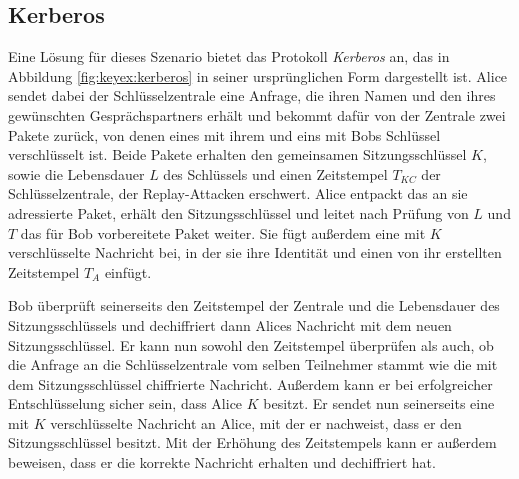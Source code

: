 \subsection{Kerberos}
Eine Lösung für dieses Szenario bietet das Protokoll \emph{Kerberos} an, das in Abbildung \ref{fig:keyex:kerberos} in seiner ursprünglichen
Form dargestellt ist. Alice sendet dabei der Schlüsselzentrale eine Anfrage, die ihren Namen und den ihres gewünschten Gesprächspartners
erhält und bekommt dafür von der Zentrale zwei Pakete zurück, von denen eines mit ihrem und eins mit Bobs Schlüssel verschlüsselt ist. Beide
Pakete erhalten den gemeinsamen Sitzungsschlüssel $K$, sowie die Lebensdauer $L$ des Schlüssels und einen Zeitstempel $T_{KC}$ der Schlüsselzentrale, der
Replay-Attacken erschwert.
Alice entpackt das an sie adressierte Paket, erhält den Sitzungsschlüssel und leitet nach Prüfung von $L$ und $T$ das für Bob vorbereitete Paket weiter. Sie
fügt außerdem eine mit $K$ verschlüsselte Nachricht bei, in der sie ihre Identität und einen von ihr erstellten Zeitstempel $T_A$ einfügt.

Bob überprüft seinerseits den Zeitstempel der Zentrale und die Lebensdauer des Sitzungsschlüssels und dechiffriert dann Alices Nachricht mit dem neuen
Sitzungsschlüssel. Er kann nun sowohl den Zeitstempel überprüfen als auch, ob die Anfrage an die Schlüsselzentrale vom selben Teilnehmer stammt wie die mit dem
Sitzungsschlüssel chiffrierte Nachricht. Außerdem kann er bei erfolgreicher Entschlüsselung sicher sein, dass Alice $K$ besitzt. Er sendet nun seinerseits eine
mit $K$ verschlüsselte Nachricht an Alice, mit der er nachweist, dass er den Sitzungsschlüssel besitzt. Mit der Erhöhung des Zeitstempels kann er außerdem
beweisen, dass er die korrekte Nachricht erhalten und dechiffriert hat.

